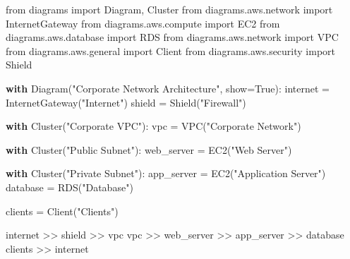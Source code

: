 \documentclass[
  letterpaper,
  DIV=11,
  numbers=noendperiod]{scrreprt}
\newenvironment{Shaded}{\begin{snugshade}}{\end{snugshade}}
\newcommand{\ControlFlowTok}[1]{\textcolor[rgb]{0.00,0.23,0.31}{\textbf{#1}}}
\newcommand{\ImportTok}[1]{\textcolor[rgb]{0.00,0.46,0.62}{#1}}
\newcommand{\NormalTok}[1]{\textcolor[rgb]{0.00,0.23,0.31}{#1}}
\newcommand{\OperatorTok}[1]{\textcolor[rgb]{0.37,0.37,0.37}{#1}}
\newcommand{\StringTok}[1]{\textcolor[rgb]{0.13,0.47,0.30}{#1}}
\newcommand{\VariableTok}[1]{\textcolor[rgb]{0.07,0.07,0.07}{#1}}
\begin{document}
\begin{Shaded}
\begin{Highlighting}[]
\ImportTok{from}\NormalTok{ diagrams }\ImportTok{import}\NormalTok{ Diagram, Cluster}
\ImportTok{from}\NormalTok{ diagrams.aws.network }\ImportTok{import}\NormalTok{ InternetGateway}
\ImportTok{from}\NormalTok{ diagrams.aws.compute }\ImportTok{import}\NormalTok{ EC2}
\ImportTok{from}\NormalTok{ diagrams.aws.database }\ImportTok{import}\NormalTok{ RDS}
\ImportTok{from}\NormalTok{ diagrams.aws.network }\ImportTok{import}\NormalTok{ VPC}
\ImportTok{from}\NormalTok{ diagrams.aws.general }\ImportTok{import}\NormalTok{ Client}
\ImportTok{from}\NormalTok{ diagrams.aws.security }\ImportTok{import}\NormalTok{ Shield}

\ControlFlowTok{with}\NormalTok{ Diagram(}\StringTok{"Corporate Network Architecture"}\NormalTok{, show}\OperatorTok{=}\VariableTok{True}\NormalTok{):}
\NormalTok{    internet }\OperatorTok{=}\NormalTok{ InternetGateway(}\StringTok{"Internet"}\NormalTok{)}
\NormalTok{    shield }\OperatorTok{=}\NormalTok{ Shield(}\StringTok{"Firewall"}\NormalTok{)}

    \ControlFlowTok{with}\NormalTok{ Cluster(}\StringTok{"Corporate VPC"}\NormalTok{):}
\NormalTok{        vpc }\OperatorTok{=}\NormalTok{ VPC(}\StringTok{"Corporate Network"}\NormalTok{)}
        
        \ControlFlowTok{with}\NormalTok{ Cluster(}\StringTok{"Public Subnet"}\NormalTok{):}
\NormalTok{            web\_server }\OperatorTok{=}\NormalTok{ EC2(}\StringTok{"Web Server"}\NormalTok{)}
        
        \ControlFlowTok{with}\NormalTok{ Cluster(}\StringTok{"Private Subnet"}\NormalTok{):}
\NormalTok{            app\_server }\OperatorTok{=}\NormalTok{ EC2(}\StringTok{"Application Server"}\NormalTok{)}
\NormalTok{            database }\OperatorTok{=}\NormalTok{ RDS(}\StringTok{"Database"}\NormalTok{)}

\NormalTok{    clients }\OperatorTok{=}\NormalTok{ Client(}\StringTok{"Clients"}\NormalTok{)}

\NormalTok{    internet }\OperatorTok{\textgreater{}\textgreater{}}\NormalTok{ shield }\OperatorTok{\textgreater{}\textgreater{}}\NormalTok{ vpc}
\NormalTok{    vpc }\OperatorTok{\textgreater{}\textgreater{}}\NormalTok{ web\_server }\OperatorTok{\textgreater{}\textgreater{}}\NormalTok{ app\_server }\OperatorTok{\textgreater{}\textgreater{}}\NormalTok{ database}
\NormalTok{    clients }\OperatorTok{\textgreater{}\textgreater{}}\NormalTok{ internet}
\end{Highlighting}
\end{Shaded}
\end{document}
